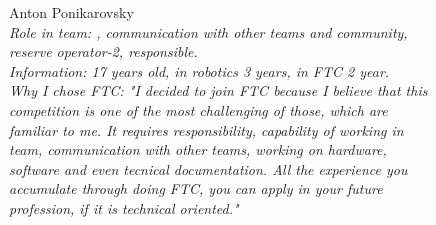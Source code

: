 \begin{figure}[H]
	\begin{minipage}[h]{0.47\linewidth}
	    Anton Ponikarovsky\\
		\emph{Role in team: , communication with other teams and community, reserve operator-2, responsible. \\  }
		\emph{Information: 17 years old, in robotics 3 years, in FTC 2 year. \\}
		\emph{Why I chose FTC: "I decided to join FTC because I believe that this competition is one of the most challenging of those, which are familiar to me. It requires responsibility, capability of working in team, communication with other teams, working on hardware, software and even tecnical documentation. All the experience you accumulate through doing FTC, you can apply in your future profession, if it is technical oriented."}			
	\end{minipage}
	\hfill
	\begin{minipage}[h]{0.47\linewidth}
		\\
	\end{minipage}
\end{figure}

